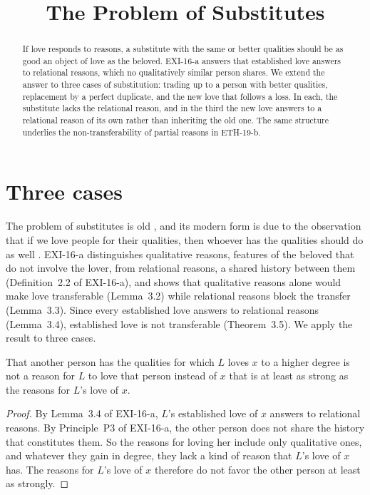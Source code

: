 \documentclass{situationist-preprint}
\title{The Problem of Substitutes}
\begin{document}
\maketitle

\begin{abstract}
If love responds to reasons, a substitute with the same or better qualities should be as good an object of love as the beloved. EXI-16-a answers that established love answers to relational reasons, which no qualitatively similar person shares. We extend the answer to three cases of substitution: trading up to a person with better qualities, replacement by a perfect duplicate, and the new love that follows a loss. In each, the substitute lacks the relational reason, and in the third the new love answers to a relational reason of its own rather than inheriting the old one. The same structure underlies the non-transferability of partial reasons in ETH-19-b.
\end{abstract}

\section{Three cases}

The problem of substitutes is old \citep[208--212]{PlatoSymp}, and its modern form is due to the observation that if we love people for their qualities, then whoever has the qualities should do as well \citep{Nozick1989,Kolodny2003}. EXI-16-a distinguishes qualitative reasons, features of the beloved that do not involve the lover, from relational reasons, a shared history between them (Definition~2.2 of EXI-16-a), and shows that qualitative reasons alone would make love transferable (Lemma~3.2) while relational reasons block the transfer (Lemma~3.3). Since every established love answers to relational reasons (Lemma~3.4), established love is not transferable (Theorem~3.5). We apply the result to three cases.

\begin{proposition}[Trading up]\label{p:up}
That another person has the qualities for which $L$ loves $x$ to a higher degree is not a reason for $L$ to love that person instead of $x$ that is at least as strong as the reasons for $L$'s love of $x$.
\end{proposition}

\begin{proof}
By Lemma~3.4 of EXI-16-a, $L$'s established love of $x$ answers to relational reasons. By Principle~P3 of EXI-16-a, the other person does not share the history that constitutes them. So the reasons for loving her include only qualitative ones, and whatever they gain in degree, they lack a kind of reason that $L$'s love of $x$ has. The reasons for $L$'s love of $x$ therefore do not favor the other person at least as strongly.
\end{proof}
\end{document}
